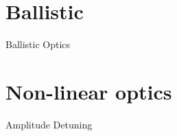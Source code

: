 \documentclass[11pt,usenames,dvipsnames,aspectratio=169]{beamer}
\begin{document}
\section{Ballistic}
\begin{frame}{Ballistic Optics}
    
\end{frame}


\section{Non-linear optics}


\begin{frame}{Amplitude Detuning}
    
\end{frame}


\end{document}
